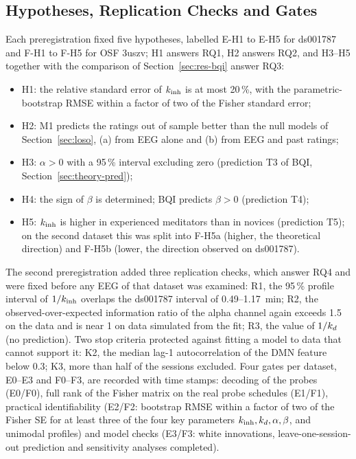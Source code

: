 \subsection{Hypotheses, Replication Checks and Gates}
\label{sec:hyp}
Each preregistration fixed five hypotheses, labelled E-H1 to E-H5 for ds001787 and F-H1 to F-H5 for OSF 3uszv; H1 answers RQ1, H2 answers RQ2, and H3--H5 together with the comparison of Section~\ref{sec:res-bqi} answer RQ3:
\begin{itemize}
  \item H1: the relative standard error of $k_{\mathrm{inh}}$ is at most 20\,\%, with the parametric-bootstrap RMSE within a factor of two of the Fisher standard error;
  \item H2: M1 predicts the ratings out of sample better than the null models of Section~\ref{sec:loso}, (a) from EEG alone and (b) from EEG and past ratings;
  \item H3: $\alpha>0$ with a 95\,\% interval excluding zero (prediction T3 of BQI, Section~\ref{sec:theory-pred});
  \item H4: the sign of $\beta$ is determined; BQI predicts $\beta>0$ (prediction T4);
  \item H5: $k_{\mathrm{inh}}$ is higher in experienced meditators than in novices (prediction T5); on the second dataset this was split into F-H5a (higher, the theoretical direction) and F-H5b (lower, the direction observed on ds001787).
\end{itemize}
The second preregistration added three replication checks, which answer RQ4 and were fixed before any EEG of that dataset was examined: R1, the 95\,\% profile interval of $1/k_{\mathrm{inh}}$ overlaps the ds001787 interval of 0.49--1.17~min; R2, the observed-over-expected information ratio of the alpha channel again exceeds 1.5 on the data and is near 1 on data simulated from the fit; R3, the value of $1/k_{d}$ (no prediction). Two stop criteria protected against fitting a model to data that cannot support it: K2, the median lag-1 autocorrelation of the DMN feature below 0.3; K3, more than half of the sessions excluded. Four gates per dataset, E0--E3 and F0--F3, are recorded with time stamps: decoding of the probes (E0/F0), full rank of the Fisher matrix on the real probe schedules (E1/F1), practical identifiability (E2/F2: bootstrap RMSE within a factor of two of the Fisher SE for at least three of the four key parameters $k_{\mathrm{inh}},k_{d},\alpha,\beta$, and unimodal profiles) and model checks (E3/F3: white innovations, leave-one-session-out prediction and sensitivity analyses completed).

